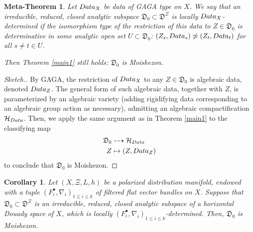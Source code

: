 \documentclass[10pt,letterpaper,english,reqno]{amsart}
\numberwithin{equation}{subsection}
\newcommand\cH{{\mathcal H}}
\newcommand\fD{{\mathfrak D}}
\newtheorem{corollary}[theorem]{Corollary}
\newtheorem{metatheorem}[theorem]{Meta-Theorem}
\theoremstyle{definition}
\begin{document}
\begin{metatheorem}\label{meta} Let ${\rm Data}_X$ be data of GAGA type on $X$.
We say that an irreducible, reduced, closed
analytic subspace $\fD_0\subset \fD^{\Xi}$
is {\rm locally ${\rm Data}_X$-determined} 
if the isomorphism type of the restriction 
of this data to $Z\in \fD_0$ is determinative
in some analytic open set $U\subset \fD_0$:
$(Z_s,{\rm Data}_s)\not\simeq (Z_t,{\rm Data}_t)$ for all $s\neq t\in U$.

Then Theorem \ref{main1} still holds: $\fD_0$ is Moishezon.
\end{metatheorem}

\begin{proof}[Sketch.] By GAGA, the restriction of 
${\rm Data}_X$ to any
$Z\in \fD_0$ is algebraic data, denoted ${\rm Data}_Z$.
The general form of such algebraic data, together with $Z$,
is parameterized by an algebraic variety (adding rigidifying
data corresponding to an algebraic group action as necessary),
admitting an algebraic compactification
$\cH_{\rm Data}$. Then, we apply the same argument as
in Theorem \ref{main1} to the classifying map
\begin{align*} \fD_0&\dashrightarrow \cH_{\rm Data} \\
Z&\mapsto (Z,{\rm  Data}_Z)\end{align*}
to conclude that $\fD_0$ is Moishezon.
\end{proof}

\begin{corollary} \label{cvhs-embed}
Let $(X, \Xi, L, h)$ be a polarized
distribution manifold, endowed with
a tuple
$(F_i^\bullet, \nabla_i)_{1\leq i\leq k}$
of filtered flat vector bundles
on $X$.
Suppose that $\fD_0\subset \fD^\Xi$
is an irreducible, reduced,
closed analytic subspace of a horizontal
Douady space of $X$, which is locally
$(F_i^\bullet, \nabla_i)_{1\leq i\leq k}$-determined.
Then, $\fD_0$ is Moishezon.
\end{corollary}
\end{document}
